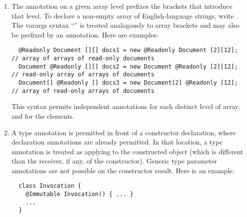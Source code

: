 \documentclass[10pt]{article}
\begin{document}
\begin{enumerate}

% 

\item
  The annotation on a given array level
  prefixes the brackets that introduce that level.  To declare
  a non-empty array of English-language strings, write .
  The varargs syntax ``'' is treated analogously to array brackets
  and may also be prefixed by an annotation.
%
  Here are examples:
\preverbnegspace
\begin{Verbatim}
  @Readonly Document [][] docs1 = new @Readonly Document [2][12]; // array of arrays of read-only documents
  Document @Readonly [][] docs2 = new Document @Readonly [2][12]; // read-only array of arrays of documents
  Document[] @Readonly [] docs3 = new Document[2] @Readonly [12]; // array of read-only arrays of documents
\end{Verbatim}

\preverbnegspace
This syntax permits independent annotations for each distinct level of
array, and for the elements.

\item
A type annotation is permitted in front of a constructor
declaration, where declaration annotations are already permitted.  In that
location, a type annotation is treated as applying to the constructed
object (which is different than the receiver, if any, of the constructor).
Generic type parameter annotations are not
possible on the constructor result.
%
  Here is an example:
\preverbnegspace
\begin{Verbatim}
  class Invocation {
    @Immutable Invocation() { ... }
    ...
  }
\end{Verbatim}
\preverbnegspace


\end{enumerate}
\end{document}
